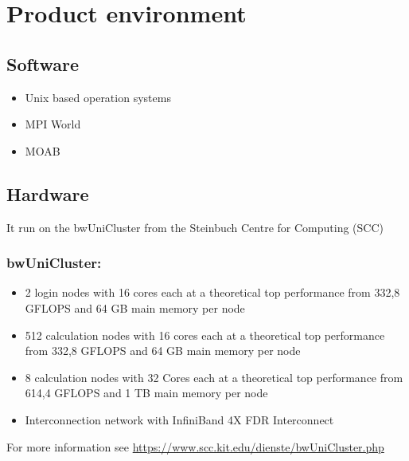\section{Product environment}
	\subsection{Software}
	\begin{itemize}
		\item{Unix based operation systems}
		\item{MPI World}
		\item{MOAB}
	\end{itemize}
	\subsection{Hardware}
	It run on the bwUniCluster from the Steinbuch Centre for Computing (SCC)
		\subsubsection{bwUniCluster:}
			\begin{itemize}
				\item{2 login nodes with 16 cores each at a theoretical top performance from 332,8 GFLOPS and 64 GB main memory per node}
				\item{512 calculation nodes with 16 cores each at a theoretical top performance from 332,8 GFLOPS and 64 GB main memory per node}
				\item{8 calculation nodes with 32 Cores each at a theoretical top performance from 614,4 GFLOPS and 1 TB main memory per node}
				\item{Interconnection network with InfiniBand 4X FDR Interconnect}
			\end{itemize}
		For more information see \href{https://www.scc.kit.edu/dienste/bwUniCluster.php}{https://www.scc.kit.edu/dienste/bwUniCluster.php}
    
 